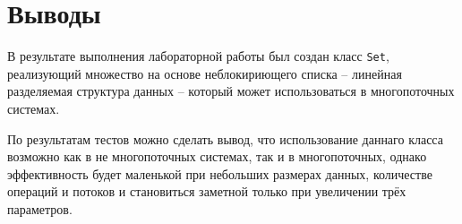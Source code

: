 \section{Выводы}

В результате выполнения лабораторной работы был
создан класс \verb|Set|,
реализующий множество на основе неблокириющего
списка -- линейная
разделяемая
структура данных --
который может использоваться в 
многопоточных системах.

По результатам тестов можно сделать вывод,
что использование даннаго класса 
возможно как в не многопоточных системах,
так и в многопоточных, однако эффективность
будет маленькой при небольших размерах
данных, количестве операций и потоков
и становиться заметной только при увеличении
трёх параметров.